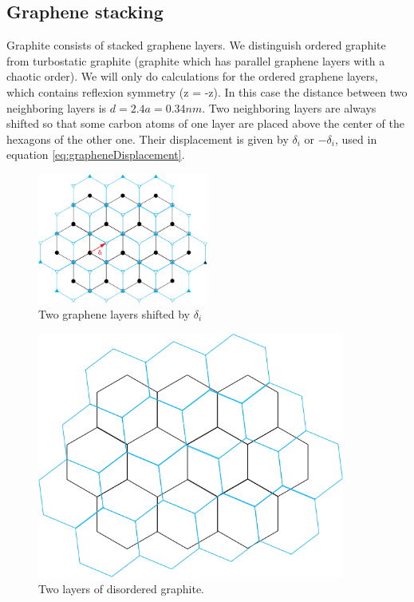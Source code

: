 		\subsection{Graphene stacking}
			Graphite consists of stacked graphene layers. We distinguish ordered graphite from turbostatic graphite (graphite which has parallel graphene layers with a chaotic order). We will only do calculations for the ordered graphene layers, which contains reflexion symmetry (z = -z). In this case the distance between two neighboring layers is $d = 2.4a = 0.34nm$. Two neighboring layers are always shifted so that some carbon atoms of one layer are placed above the center of the hexagons of the other one. Their displacement is given by $\delta_i$ or $-\delta_i$, used in equation \ref{eq:grapheneDisplacement}.
			
		\begin{figure}[ht]
			\label{fig:grapheneStacking}
			\centering
			\includegraphics[width=0.5\textwidth]{figures/Carbon/grapheneStacking.png}
			\caption{Two graphene layers shifted by $\delta_i$}
		\end{figure}
		
		\begin{figure}[ht]
			\label{fig:graphiteDisordered}
			\centering
			\includegraphics[width=0.9\textwidth]{figures/Carbon/graphiteDisordered.png}
			\caption{Two layers of disordered graphite.}
		\end{figure}
		

		
			
	
	